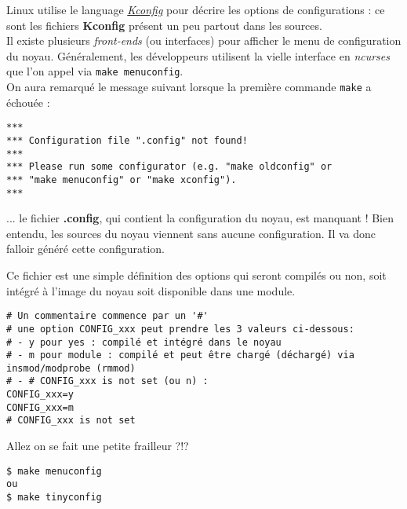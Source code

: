 \documentclass[a4paper]{article}
\begin{document}
Linux utilise le language \textit{\href{https://www.kernel.org/doc/Documentation/kbuild/kconfig-language.txt}{Kconfig}} pour décrire les options de configurations : ce sont les fichiers \textbf{Kconfig} présent un peu partout dans les sources.\\

Il existe plusieurs \textit{front-ends} (ou interfaces) pour afficher le menu de configuration du noyau. Généralement, les développeurs utilisent la vielle interface en \textit{ncurses} que l'on appel via \lstset{language=sh}\lstinline{make menuconfig}.\\

On aura remarqué le message suivant lorsque la première commande \lstset{language=sh}\lstinline{make} a échouée :
\begin{verbatim}
***
*** Configuration file ".config" not found!
***
*** Please run some configurator (e.g. "make oldconfig" or
*** "make menuconfig" or "make xconfig").
***
\end{verbatim}
... le fichier \textbf{.config}, qui contient la configuration du noyau, est manquant ! Bien entendu, les sources du noyau viennent sans aucune configuration. Il va donc falloir généré cette configuration.

Ce fichier est une simple définition des options qui seront compilés ou non, soit intégré à l'image du noyau soit disponible dans une module.
\begin{verbatim}
# Un commentaire commence par un '#'
# une option CONFIG_xxx peut prendre les 3 valeurs ci-dessous:
# - y pour yes : compilé et intégré dans le noyau
# - m pour module : compilé et peut être chargé (déchargé) via insmod/modprobe (rmmod)
# - # CONFIG_xxx is not set (ou n) : 
CONFIG_xxx=y
CONFIG_xxx=m
# CONFIG_xxx is not set
\end{verbatim}

Allez on se fait une petite frailleur ?!?
\begin{verbatim}
$ make menuconfig
ou
$ make tinyconfig
\end{verbatim}
\end{document}
